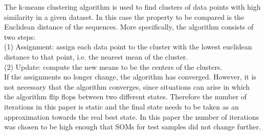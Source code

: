 The k-means clustering algorithm is used to find clusters of data points with high similarity in a given dataset. In this case the property to be compared is the Euclidean distance of the sequences. More specifically, the algorithm consists of two steps:\\
(1) Assignment: assign each data point to the cluster with the lowest euclidean distance to that point, i.e. the nearest mean of the cluster. \\
(2) Update: compute the new means to be the centers of the clusters. \\
If the assignments no longer change, the algorithm has converged. However, it is not necessary that the algorithm converges, since situations can arise in which the algorithm flip flops between two different states. Therefore the number of iterations in this paper is static and the final state needs to be taken as an approximation towards the real best state. In this paper the number of iterations was chosen to be high enough that SOMs for test samples did not change further. 